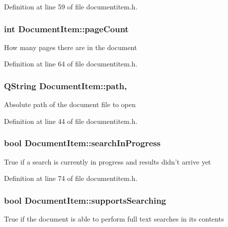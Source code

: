 Definition at line 59 of file documentitem.\+h.

\hypertarget{classDocumentItem_a2604989a9553d297a141f14d2b00e142}{
\subsubsection[{page\+Count}]{\setlength{\rightskip}{0pt plus 5cm}int Document\+Item\+::page\+Count\hspace{0.3cm}{\ttfamily [read]}}}\label{classDocumentItem_a2604989a9553d297a141f14d2b00e142}
How many pages there are in the document 

Definition at line 64 of file documentitem.\+h.

\hypertarget{classDocumentItem_a30563830d010ecd2bcff1fe87d3f22b5}{
\subsubsection[{path}]{\setlength{\rightskip}{0pt plus 5cm}Q\+String Document\+Item\+::path\hspace{0.3cm}{\ttfamily [read]}, {\ttfamily [write]}}}\label{classDocumentItem_a30563830d010ecd2bcff1fe87d3f22b5}
Absolute path of the document file to open 

Definition at line 44 of file documentitem.\+h.

\hypertarget{classDocumentItem_a45a70095fcc040a324f5f2f2cc550282}{
\subsubsection[{search\+In\+Progress}]{\setlength{\rightskip}{0pt plus 5cm}bool Document\+Item\+::search\+In\+Progress\hspace{0.3cm}{\ttfamily [read]}}}\label{classDocumentItem_a45a70095fcc040a324f5f2f2cc550282}
True if a search is currently in progress and results didn't arrive yet 

Definition at line 74 of file documentitem.\+h.

\hypertarget{classDocumentItem_a0bff2b3923d9140ca120dabbf527b4fa}{
\subsubsection[{supports\+Searching}]{\setlength{\rightskip}{0pt plus 5cm}bool Document\+Item\+::supports\+Searching\hspace{0.3cm}{\ttfamily [read]}}}\label{classDocumentItem_a0bff2b3923d9140ca120dabbf527b4fa}
True if the document is able to perform full text searches in its contents 

